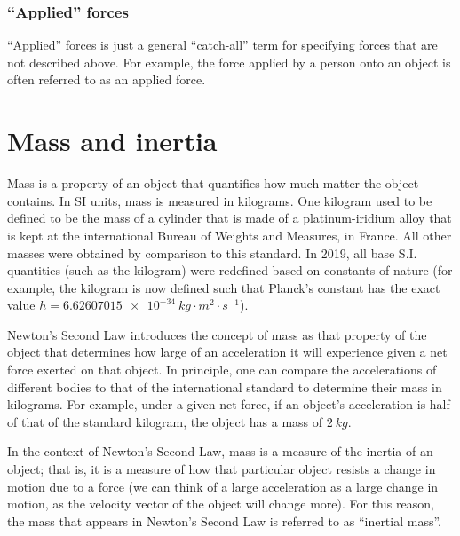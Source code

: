 \subsubsection{``Applied'' forces}
``Applied'' forces is just a general ``catch-all'' term for specifying forces that are not described above. For example, the force applied by a person onto an object is often referred to as an applied force. 

\section{Mass and inertia}
Mass is a property of an object that quantifies how much matter the object contains. In SI units, mass is measured in kilograms. One kilogram used to be defined to be the mass of a cylinder that is made of a platinum-iridium alloy that is kept at the international Bureau of Weights and Measures, in France. All other masses were obtained by comparison to this standard. In 2019, all base S.I. quantities (such as the kilogram) were redefined based on constants of nature (for example, the kilogram is now defined such that Planck's constant has the exact value $h=\SI{6.62607015e-34}{kg\cdot m^2\cdot s^{-1}}$).

Newton's Second Law introduces the concept of mass as that property of the object that determines how large of an acceleration it will experience given a net force exerted on that object. In principle, one can compare the accelerations of different bodies to that of the international standard to determine their mass in kilograms. For example, under a given net force, if an object's acceleration is half of that of the standard kilogram, the object has a mass of $\SI{2}{kg}$. 

In the context of Newton's Second Law, mass is a measure of the inertia of an object; that is, it is a measure of how that particular object resists a change in motion due to a force (we can think of a large acceleration as a large change in motion, as the velocity vector of the object will change more). For this reason, the mass that appears in Newton's Second Law is referred to as ``inertial mass''.

